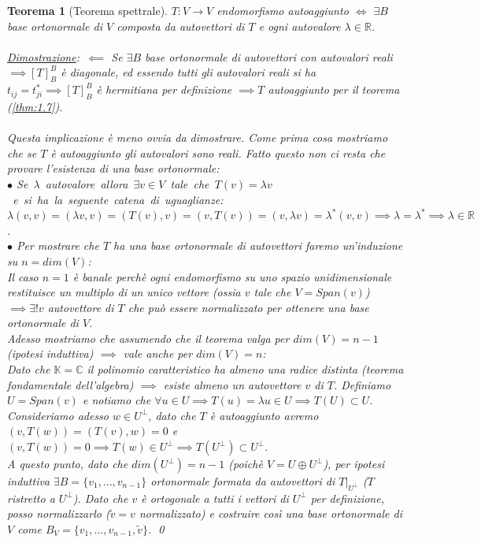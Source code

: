 \documentclass[a4paper,12pt]{report}
\newtheorem{teorema}{Teorema}[chapter]
\begin{document}
\begin{teorema}[Teorema spettrale]\label{thm: 1.8}
    $T:V \to V$ endomorfismo autoaggiunto $\iff$ $\exists B$ base ortonormale di $V$ composta da autovettori di $T$ e ogni autovalore $\lambda \in \mathbb{R}$.
    \\
    \\ \underline{Dimostrazione}:\ $\boxed{\impliedby}$ Se $\exists B$ base ortonormale di autovettori con autovalori reali $\implies [T]_B^B$ è diagonale, ed essendo tutti gli autovalori reali si ha $t_{ij}=t_{ji}^*\implies [T]_B^B$ è hermitiana per definizione $\implies T$ autoaggiunto per  il teorema (\ref{thm:1.7}).
    \\
    \\ \boxed{\implies} Questa implicazione è meno ovvia da dimostrare. Come prima cosa mostriamo che se $T$ è autoaggiunto gli autovalori sono reali. Fatto questo non ci resta che provare l'esistenza di una base ortonormale:
    \\ $\bullet$ \mbox{Se $\lambda$ autovalore allora $\exists v \in V$ tale che $T(v)=\lambda v$ e si ha la seguente catena di uguaglianze}:
    \\ $\lambda (v,v)=(\lambda v,v)=(T(v),v)=(v,T(v))=(v,\lambda v)=\lambda^*(v,v) \implies\lambda=\lambda^*\implies \lambda \in \mathbb{R}$.
    \\ $\bullet$ Per mostrare che $T$ ha una base ortonormale di autovettori faremo un'induzione su $n=dim(V)$:
    \\Il caso $n=1$ è banale perchè ogni endomorfismo su uno spazio unidimensionale restituisce un multiplo di un unico vettore (ossia $v$ tale che $V=Span(v)$) $\implies \exists!v$ autovettore di $T$ che può essere normalizzato per ottenere una base ortonormale di $V$.
    \\ Adesso mostriamo che assumendo che il teorema valga per $dim(V)=n-1$ (ipotesi induttiva) $\implies$ vale anche per $dim(V)=n$:
    \\Dato che $\mathbb{K}=\mathbb{C}$ il polinomio caratteristico ha almeno una radice distinta (teorema fondamentale dell'algebra) $\implies$ esiste almeno un autovettore $v$ di $T$. Definiamo $U=Span(v)$ e notiamo che $\forall u \in U \implies T(u)=\lambda u \in U \implies T(U)\subset U$. Consideriamo adesso $w \in U^{\perp}$, dato che $T$ è autoaggiunto avremo $(v,T(w))=(T(v),w)=0$ e $(v,T(w))=0 \implies T(w) \in U^{\perp} \implies T(U^{\perp}) \subset U^{\perp}.$
    \\A questo punto, dato che $dim(U^{\perp})=n-1$ (poichè $V=U\oplus U^\perp$), per ipotesi induttiva $\exists B=\{v_1,...,v_{n-1}\}$ ortonormale formata da autovettori di $T|_{U^{\perp}}$ ($T$ ristretto a $U^{\perp}$). Dato che $v$ è ortogonale a tutti i vettori di $U^{\perp}$ per definizione, posso normalizzarlo ($\widetilde v=v$ normalizzato)  e costruire così una base ortonormale di $V$ come $B_V=\{v_1,...,v_{n-1},\widetilde v\}$. \qed
     
\end{teorema}
\end{document}
